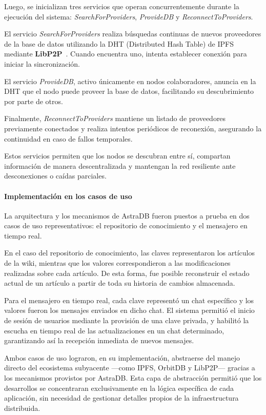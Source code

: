 Luego, se inicializan tres servicios que operan concurrentemente durante la ejecución del sistema: \textit{SearchForProviders}, \textit{ProvideDB} y \textit{ReconnectToProviders}.

El servicio \textit{SearchForProviders} realiza búsquedas continuas de nuevos proveedores de la base de datos utilizando la DHT (Distributed Hash Table) de IPFS mediante \textbf{LibP2P}~\cite{libp2p}. Cuando encuentra uno, intenta establecer conexión para iniciar la sincronización.

El servicio \textit{ProvideDB}, activo únicamente en nodos colaboradores, anuncia en la DHT que el nodo puede proveer la base de datos, facilitando su descubrimiento por parte de otros.

Finalmente, \textit{ReconnectToProviders} mantiene un listado de proveedores previamente conectados y realiza intentos periódicos de reconexión, asegurando la continuidad en caso de fallos temporales.

Estos servicios permiten que los nodos se descubran entre sí, compartan información de manera descentralizada y mantengan la red resiliente ante desconexiones o caídas parciales.

\paragraph{Implementación en los casos de uso}

La arquitectura y los mecanismos de AstraDB fueron puestos a prueba en dos casos de uso representativos: el repositorio de conocimiento y el mensajero en tiempo real.

En el caso del repositorio de conocimiento, las claves representaron los artículos de la wiki, mientras que los valores correspondieron a las modificaciones realizadas sobre cada artículo. De esta forma, fue posible reconstruir el estado actual de un artículo a partir de toda su historia de cambios almacenada.

Para el mensajero en tiempo real, cada clave representó un chat específico y los valores fueron los mensajes enviados en dicho chat. El sistema permitió el inicio de sesión de usuarios mediante la provisión de una clave privada, y habilitó la escucha en tiempo real de las actualizaciones en un chat determinado, garantizando así la recepción inmediata de nuevos mensajes.

Ambos casos de uso lograron, en su implementación, abstraerse del manejo directo del ecosistema subyacente —como IPFS, OrbitDB y LibP2P— gracias a los mecanismos provistos por AstraDB. Esta capa de abstracción permitió que los desarrollos se concentraran exclusivamente en la lógica específica de cada aplicación, sin necesidad de gestionar detalles propios de la infraestructura distribuida.

